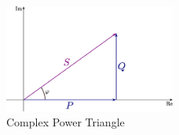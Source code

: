 \documentclass[12pt]{article}
\begin{document}
\begin{figure}[p]
	\centering
	\includegraphics[width=0.5\textwidth]{img/complexpwr}
	\caption{Complex Power Triangle}
	\label{complexpwr}
\end{figure}
\end{document}
